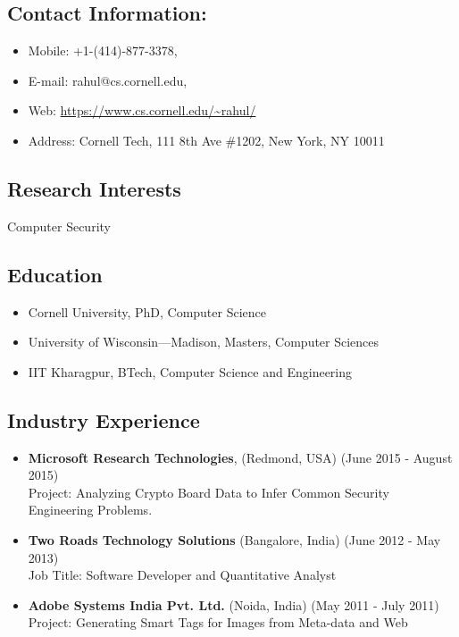 \subsection*{Contact Information:}\label{contact-information}
\begin{itemize}
\tightlist
\item
  Mobile: +1-(414)-877-3378,
\item
  E-mail: rahul@cs.cornell.edu,
\item
  Web: \url{https://www.cs.cornell.edu/~rahul/}
\item
  Address: Cornell Tech, 111 8th Ave \#1202, New York, NY 10011
\end{itemize}

\subsection*{Research Interests}\label{research-interests}
Computer Security

\subsection*{Education}\label{education}

\begin{itemize}
\tightlist
\item
  Cornell University, PhD, Computer Science
\item
  University of Wisconsin---Madison, Masters, Computer Sciences
\item IIT Kharagpur, BTech, Computer
  Science and Engineering
\end{itemize}

\subsection*{Industry Experience}\label{work-experience}
\begin{itemize}
\item
  \textbf{Microsoft Research Technologies}, (Redmond, USA) (June 2015 - August 2015)\\
  Project: Analyzing Crypto Board Data to Infer Common Security
  Engineering Problems.
\item
  \textbf{Two Roads Technology Solutions} (Bangalore, India) (June 2012 - May 2013)\\
  Job Title: Software Developer and Quantitative Analyst
\item
  \textbf{Adobe Systems India Pvt. Ltd.} (Noida, India) (May 2011 - July 2011)\\
  Project: Generating Smart Tags for Images from Meta-data and Web
\end{itemize}

